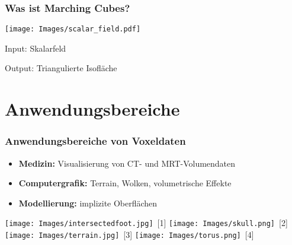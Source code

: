 \documentclass{beamer}
\begin{document}
\begin{frame}[t]
  \frametitle{Was ist Marching Cubes?}
  \centering
  \vspace{0.5cm}

  \vspace{-0.5cm}
  \texttt{[image: Images/scalar\_field.pdf]}

  \vspace{-0.5em}

  \begin{minipage}[t]{0.48\textwidth}
    \hspace*{2em}
    \raggedright
    Input: Skalarfeld
  \end{minipage}
  \hfill
  \begin{minipage}[t]{0.48\textwidth}
    \raggedleft
    Output: Triangulierte Isofläche
  \end{minipage}
\end{frame}

\section{Anwendungsbereiche}
\begin{frame}[t]
  \frametitle{Anwendungsbereiche von Voxeldaten}
  \begin{itemize}
    \item \textbf{Medizin:} Visualisierung von CT- und MRT-Volumendaten
    \item \textbf{Computergrafik:} Terrain, Wolken, volumetrische Effekte
    \item \textbf{Modellierung:} implizite Oberflächen
  \end{itemize}
  \centering
  \texttt{[image: Images/intersectedfoot.jpg]}~\scriptsize[1]
  \texttt{[image: Images/skull.png]}~\scriptsize[2]
  \texttt{[image: Images/terrain.jpg]}~\scriptsize[3]
  \texttt{[image: Images/torus.png]}~\scriptsize[4]
\end{frame}
\end{document}
